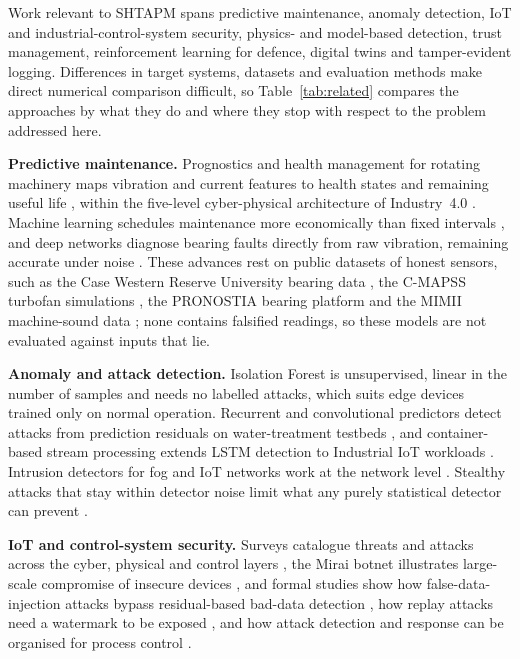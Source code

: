 \documentclass[11pt,a4paper]{article}
\begin{document}
Work relevant to SHTAPM spans predictive maintenance, anomaly detection, IoT and industrial-control-system security, physics- and model-based detection, trust management, reinforcement learning for defence, digital twins and tamper-evident logging. Differences in target systems, datasets and evaluation methods make direct numerical comparison difficult, so Table~\ref{tab:related} compares the approaches by what they do and where they stop with respect to the problem addressed here.

\textbf{Predictive maintenance.} Prognostics and health management for rotating machinery maps vibration and current features to health states and remaining useful life \cite{lee2014phm}, within the five-level cyber-physical architecture of Industry~4.0 \cite{lee2015cps}. Machine learning schedules maintenance more economically than fixed intervals \cite{susto2015pdm}, and deep networks diagnose bearing faults directly from raw vibration, remaining accurate under noise \cite{zhang2017wdcnn,zhao2019dlhealth}. These advances rest on public datasets of honest sensors, such as the Case Western Reserve University bearing data \cite{smith2015cwru}, the C-MAPSS turbofan simulations \cite{saxena2008cmapss}, the PRONOSTIA bearing platform \cite{nectoux2012pronostia} and the MIMII machine-sound data \cite{purohit2019mimii}; none contains falsified readings, so these models are not evaluated against inputs that lie.

\textbf{Anomaly and attack detection.} Isolation Forest \cite{liu2008iforest} is unsupervised, linear in the number of samples and needs no labelled attacks, which suits edge devices trained only on normal operation. Recurrent and convolutional predictors detect attacks from prediction residuals on water-treatment testbeds \cite{malhotra2015lstm,goh2017rnn,kravchik2018cnn}, and container-based stream processing extends LSTM detection to Industrial IoT workloads \cite{wang2023container}. Intrusion detectors for fog and IoT networks work at the network level \cite{almiani2020rnn}. Stealthy attacks that stay within detector noise limit what any purely statistical detector can prevent \cite{urbina2016stealthy}.

\textbf{IoT and control-system security.} Surveys catalogue threats and attacks across the cyber, physical and control layers \cite{humayed2017cps,mitchell2014ids,ding2018survey}, the Mirai botnet illustrates large-scale compromise of insecure devices \cite{kolias2017mirai}, and formal studies show how false-data-injection attacks bypass residual-based bad-data detection \cite{liu2009fdi}, how replay attacks need a watermark to be exposed \cite{mo2009replay}, and how attack detection and response can be organised for process control \cite{cardenas2011attacks}.
\end{document}
